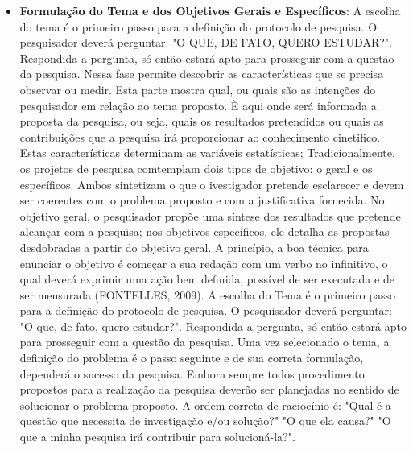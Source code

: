  \begin{itemize}
   \item \textbf{Formulação do Tema e dos Objetivos Gerais e Específicos}: 
   A escolha do tema é o primeiro passo para a definição do protocolo de pesquisa. O pesquisador deverá perguntar: "O QUE, DE FATO, QUERO ESTUDAR?". Respondida a pergunta, só então estará apto para prosseguir com a questão da pesquisa. Nessa fase permite
descobrir as características que se precisa observar ou medir.
Esta parte mostra qual, ou quais são as intenções do pesquisador
em relação ao tema proposto. È aqui onde será informada a proposta
da pesquisa, ou seja, quais os resultados pretendidos ou quais as
contribuições que a pesquisa irá proporcionar ao conhecimento
cinetifico. Estas características determinam as variáveis
estatísticas; Tradicionalmente, os projetos de pesquisa comtemplam
dois tipos de objetivo: o geral e os específicos. Ambos sintetizam
o que o ivestigador pretende esclarecer e devem ser coerentes com
o problema proposto e com a justificativa fornecida. No objetivo
geral, o pesquisador propõe uma síntese dos resultados que
pretende alcançar com a pesquisa; nos objetivos específicos, ele
detalha as propostas desdobradas a partir do objetivo geral. A
princípio, a boa técnica para enunciar o objetivo é começar a sua
redação com um verbo no infinitivo, o qual deverá exprimir uma
ação bem definida, possível de ser executada e de ser mensurada
(FONTELLES, 2009). A escolha do Tema é o primeiro passo para a definição do protocolo de pesquisa. O pesquisador deverá perguntar: "O que, de fato, quero estudar?". Respondida a pergunta, só então estará apto para prosseguir com a questão da pesquisa. Uma vez selecionado o tema, a definição do problema é o passo seguinte e de sua correta formulação, dependerá o sucesso da pesquisa. Embora sempre todos procedimento propostos para a realização da pesquisa deverão ser planejadas no sentido de solucionar o problema proposto. A ordem correta de raciocínio é: "Qual é a questão que necessita de investigação e/ou solução?" 
"O que ela causa?" "O que a minha pesquisa irá contribuir para solucioná-la?".     




\end{itemize}
